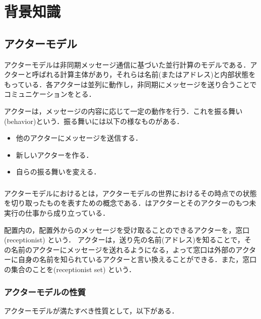 \section{背景知識}


\subsection{アクターモデル}

アクターモデルは非同期メッセージ通信に基づいた並行計算のモデルである\cite[actor]{actor}．アクターと呼ばれる計算主体があり，それらは名前(またはアドレス)と内部状態をもっている．各アクターは並列に動作し，非同期にメッセージを送り合うことでコミュニケーションをとる．

アクターは，メッセージの内容に応じて一定の動作を行う．これを振る舞い(behavior)という．振る舞いには以下の様なものがある．

\begin{itemize}
  \item 他のアクターにメッセージを送信する．
  \item 新しいアクターを作る．
  \item 自らの振る舞いを変える．
\end{itemize}

\subsubsection{\conf}

アクターモデルにおける\conf とは，アクターモデルの世界におけるその時点での状態を切り取ったものを表すための概念である．\conf はアクターとそのアクターのもつ未実行の仕事から成り立っている．

配置内の，配置外からのメッセージを受け取ることのできるアクターを，窓口(receptionist) という．
アクターは，送り先の名前(アドレス)を知ることで，その名前のアクターにメッセージを送れるようになる，よって窓口は外部のアクターに自身の名前を知られているアクターと言い換えることができる．また，窓口の集合のことを\recep (receptionist set) という．


\subsubsection{アクターモデルの性質}

アクターモデルが満たすべき性質として，以下がある．

